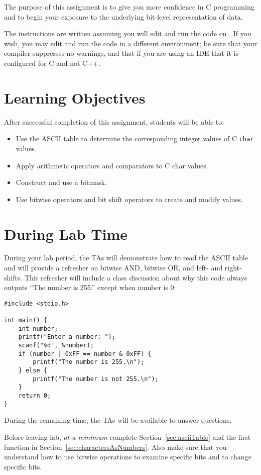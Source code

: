 The purpose of this assignment is to give you more confidence in C programming and to begin your exposure to the underlying bit-level representation of data.

The instructions are written assuming you will edit and run the code on \runtimeenvironment.
If you wish, you may edit and run the code in a different environment;
be sure that your compiler suppresses no warnings, and that if you are using an IDE that it is configured for C and not C++.

\tableofcontents

\section*{Learning Objectives}

After successful completion of this assignment, students will be able to:
\begin{itemize}
    \item Use the ASCII table to determine the corresponding integer values of C \lstinline{char} values.
    \item Apply arithmetic operators and comparators to C \lstinline{}{char} values.
    \item Construct and use a bitmask.
    \item Use bitwise operators and bit shift operators to create and modify values.
\end{itemize}

\section*{During Lab Time}

During your lab period, the TAs will demonstrate how to read the ASCII table and will provide a refresher on bitwise AND, bitwise OR, and left- and right-shifts.
This refresher will include a class discussion about why this code always outputs ``The number is 255.'' except when number is 0:
\begin{lstlisting}
#include <stdio.h>

int main() {
    int number;
    printf("Enter a number: ");
    scanf("%d", &number);
    if (number | 0xFF == number & 0xFF) {
        printf("The number is 255.\n");
    } else {
        printf("The number is not 255.\n");
    }
    return 0;
}
\end{lstlisting}
During the remaining time, the TAs will be available to answer questions.

Before leaving lab, \textit{at a minimum} complete Section~\ref{sec:asciiTable} and the first function in Section~\ref{sec:charactersAsNumbers}.
Also make sure that you understand how to use bitwise operations to examine specific bits and to change specific bits.
